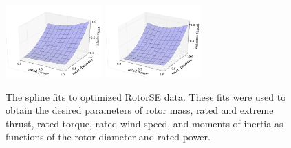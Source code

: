 \begin{figure}[htbp]
 \includegraphics[trim={2cm 0 0 0},clip,width=0.33\textwidth]{Figures/blade_mass.pdf}\label{blade_mass}
 \includegraphics[trim={2cm 0 0 0},clip,width=0.33\textwidth]{Figures/extreme_thrust.pdf}\label{extreme_thrust}
  \caption{\label{rotor_nacelle} The spline fits to optimized RotorSE data. These fits were used to obtain the desired parameters of rotor mass, rated and extreme thrust, rated torque, rated wind speed, and moments of inertia as functions of the rotor diameter and rated power.}
\end{figure}